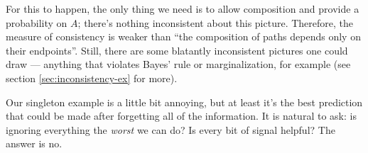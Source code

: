 \documentclass{article}
\begin{document}
	For this to happen, the only thing we need is to allow composition and provide a probability on $A$; there's nothing inconsistent about this picture. Therefore, the measure of consistency is weaker than ``the composition of paths depends only on their endpoints''. Still, there are some blatantly inconsistent pictures one could draw --- anything that violates Bayes' rule or marginalization, for example (see section \ref{sec:inconsistency-ex} for more).
	
	Our singleton example is a little bit annoying, but at least it's the best prediction that could be made after forgetting all of the information. It is natural to ask: is ignoring everything the \emph{worst} we can do? Is every bit of signal helpful? The answer is no. %
	
\end{document}
